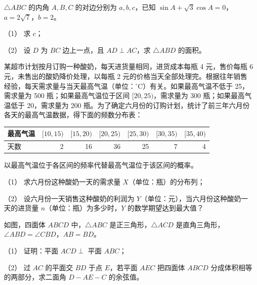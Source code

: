 \begin{question}
\(\triangle ABC\) 的内角 \(A,B,C\) 的对边分别为 \(a,b,c\)，已知 \(\sin A+\sqrt3\cos A=0\)，\(a=2\sqrt7\)，\(b=2\)。

   （1） 求 \(c\)；

   （2） 设 \(D\) 为 \(BC\) 边上一点，且 \(AD\perp AC\)，求 \(\triangle ABD\) 的面积。

\end{question}
\begin{question}
某超市计划按月订购一种酸奶，每天进货量相同，进货成本每瓶 4 元，售价每瓶 6 元，未售出的酸奶降价处理，以每瓶 2 元的价格当天全部处理完。根据往年销售经验，每天需求量与当天最高气温（单位：\(^\circ\mathrm C\)）有关。如果最高气温不低于 25，需求量为 500 瓶；如果最高气温位于区间 \([20,25)\)，需求量为 300 瓶；如果最高气温低于 20，需求量为 200 瓶。为了确定六月份的订购计划，统计了前三年六月份各天的最高气温数据，得下面的频数分布表：

\begin{center}
\begin{tabular}{lrrrrrr}
\toprule
最高气温 & \([10,15)\) & \([15,20)\) & \([20,25)\) & \([25,30)\) & \([30,35)\) & \([35,40)\) \\
\midrule
天数 & 2 & 16 & 36 & 25 & 7 & 4 \\
\bottomrule
\end{tabular}
\end{center}

   以最高气温位于各区间的频率代替最高气温位于该区间的概率。

   （1） 求六月份这种酸奶一天的需求量 \(X\)（单位：瓶）的分布列；

   （2） 设六月份一天销售这种酸奶的利润为 \(Y\)（单位：元），当六月份这种酸奶一天的进货量 \(n\)（单位：瓶）为多少时，\(Y\) 的数学期望达到最大值？

\Needspace{0.4\textheight}
\end{question}
\begin{question}
如图，四面体 \(ABCD\) 中，\(\triangle ABC\) 是正三角形，\(\triangle ACD\) 是直角三角形，\(\angle ABD=\angle CBD\)，\(AB=BD\)。
\nopagebreak[4]
\begin{center}\end{center}
\nopagebreak[4]
   （1） 证明：平面 \(ACD\perp\) 平面 \(ABC\)；

   （2） 过 \(AC\) 的平面交 \(BD\) 于点 \(E\)，若平面 \(AEC\) 把四面体 \(ABCD\) 分成体积相等的两部分，求二面角 \(D-AE-C\) 的余弦值。

\end{question}
